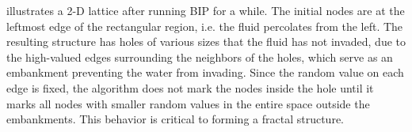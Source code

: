  illustrates a 2-D lattice after running BIP for a while. The initial nodes are 
at the leftmost edge of the rectangular region, i.e. the fluid percolates from the left. The
resulting structure has holes of various sizes that the fluid has not invaded, due to
the high-valued edges surrounding the neighbors of the holes, which serve as an embankment preventing the water from invading. Since the random value
on each edge is fixed, the algorithm does not mark the nodes inside the hole until it marks all nodes with smaller
random values in the entire space outside the embankments.
This behavior is critical to forming a fractal structure.

